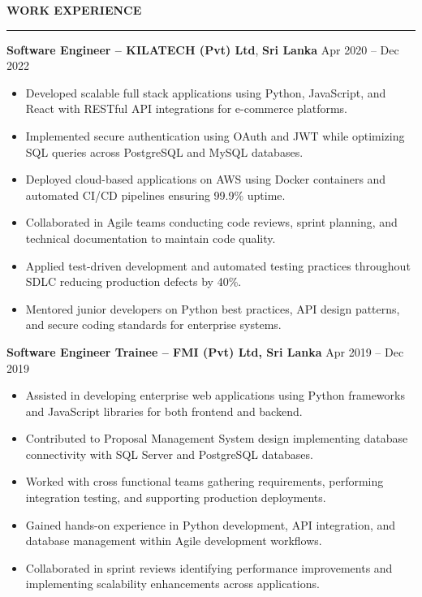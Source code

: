 \documentclass[10pt,letterpaper]{article}
\begin{document}
\vspace{8pt}

\textbf{WORK EXPERIENCE}\\[-8pt]
\noindent\rule{\textwidth}{1pt}

\vspace{-2pt}

\textbf{Software Engineer -- KILATECH (Pvt) Ltd}, \textbf{Sri Lanka} \hfill Apr 2020 -- Dec 2022

\vspace{-1pt}

\begin{itemize}
\item Developed scalable full stack applications using Python, JavaScript, and React with RESTful API integrations for e-commerce platforms.
\item Implemented secure authentication using OAuth and JWT while optimizing SQL queries across PostgreSQL and MySQL databases.
\item Deployed cloud-based applications on AWS using Docker containers and automated CI/CD pipelines ensuring 99.9\% uptime.
\item Collaborated in Agile teams conducting code reviews, sprint planning, and technical documentation to maintain code quality.
\item Applied test-driven development and automated testing practices throughout SDLC reducing production defects by 40\%.
\item Mentored junior developers on Python best practices, API design patterns, and secure coding standards for enterprise systems.
\end{itemize}

\textbf{Software Engineer Trainee -- FMI (Pvt) Ltd, Sri Lanka} \hfill Apr 2019 -- Dec 2019

\vspace{-1pt}

\begin{itemize}
\item Assisted in developing enterprise web applications using Python frameworks and JavaScript libraries for both frontend and backend.
\item Contributed to Proposal Management System design implementing database connectivity with SQL Server and PostgreSQL databases.
\item Worked with cross functional teams gathering requirements, performing integration testing, and supporting production deployments.
\item Gained hands-on experience in Python development, API integration, and database management within Agile development workflows.
\item Collaborated in sprint reviews identifying performance improvements and implementing scalability enhancements across applications.
\end{itemize}
\end{document}
